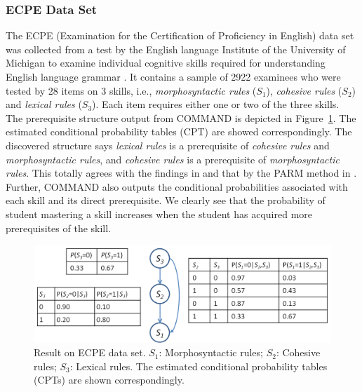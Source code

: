 \documentclass{edm_template}
\begin{document}
	\subsubsection{ECPE Data Set}
	The ECPE (Examination for the Certification of Proficiency in English) data set was collected from a test by the English language Institute
	of the University of Michigan to examine individual cognitive skills required for understanding English language grammar \cite{templin2014hierarchical}.
	It contains a sample of 2922 examinees who were tested by 28 items on 3 skills, i.e., \emph{morphosyntactic rules} ($S_1$), \emph{cohesive rules} ($S_2$) 
	and \emph{lexical rules} ($S_3$). Each item requires either one or two of the three skills. 
	The prerequisite structure output from COMMAND is depicted in Figure~\ref{fig:ecpe-result}. The estimated conditional probability tables (CPT) are showed correspondingly.
	The discovered structure says \emph{lexical rules} is a prerequisite of \emph{cohesive rules} and \emph{morphosyntactic rules}, 
	and \emph{cohesive rules} is a prerequisite of \emph{morphosyntactic rules}. 
	This totally agrees with the findings in \cite{templin2014hierarchical} and that by the PARM method in \cite{chen2015discovering}.
	Further, COMMAND also outputs the conditional probabilities associated with each skill and its direct prerequisite.
	We clearly see that the probability of student mastering a skill increases when the student has acquired more prerequisites of the skill.
	
			\begin{figure}[!th]
				\begin{center}
					\centering
					\includegraphics[width=1.0\linewidth]{figures/ecpe_results.png}
				\end{center}
				\caption{Result on ECPE data set. $S_1$: Morphosyntactic rules; $S_2$: Cohesive rules; $S_3$: Lexical rules. 
					The estimated conditional probability tables (CPTs) are shown correspondingly.}
				\label{fig:ecpe-result} 
			\end{figure}
	
\end{document}
